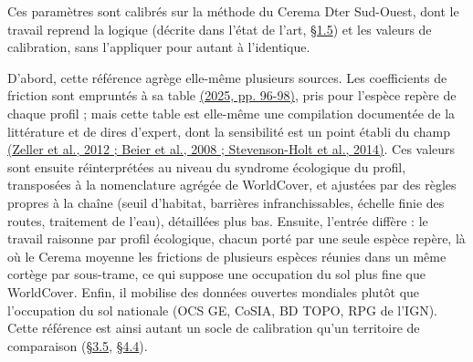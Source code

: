 \documentclass[a4paper,11pt]{report}
\begin{document}
Ces paramètres sont calibrés sur la méthode du Cerema Dter Sud-Ouest, dont le travail reprend la logique (décrite dans l'état de l'art, \hyperref[sec:1.5]{§1.5}) et les valeurs de calibration, sans l'appliquer pour autant à l'identique.

D'abord, cette référence agrège elle-même plusieurs sources. Les coefficients de friction sont empruntés à sa table \hyperref[sec:bibliographie]{(2025, pp. 96-98)}, pris pour l'espèce repère de chaque profil ; mais cette table est elle-même une compilation documentée de la littérature et de dires d'expert, dont la sensibilité est un point établi du champ \hyperref[sec:bibliographie]{(Zeller et al., 2012 ; Beier et al., 2008 ; Stevenson-Holt et al., 2014)}. Ces valeurs sont ensuite réinterprétées au niveau du syndrome écologique du profil, transposées à la nomenclature agrégée de WorldCover, et ajustées par des règles propres à la chaîne (seuil d'habitat, barrières infranchissables, échelle finie des routes, traitement de l'eau), détaillées plus bas. Ensuite, l'entrée diffère : le travail raisonne par profil écologique, chacun porté par une seule espèce repère, là où le Cerema moyenne les frictions de plusieurs espèces réunies dans un même cortège par sous-trame, ce qui suppose une occupation du sol plus fine que WorldCover. Enfin, il mobilise des données ouvertes mondiales plutôt que l'occupation du sol nationale (OCS GE, CoSIA, BD TOPO, RPG de l'IGN). Cette référence est ainsi autant un socle de calibration qu'un territoire de comparaison (\hyperref[sec:3.5]{§3.5}, \hyperref[sec:4.4]{§4.4}).
\end{document}
